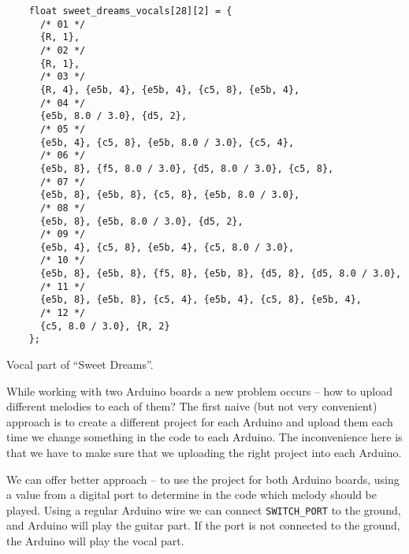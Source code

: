 \documentclass[../sparc.tex]{subfiles}
\begin{document}
\begin{listing}[!h]
  \begin{verbatim}
    float sweet_dreams_vocals[28][2] = {
      /* 01 */
      {R, 1},
      /* 02 */
      {R, 1},
      /* 03 */
      {R, 4}, {e5b, 4}, {e5b, 4}, {c5, 8}, {e5b, 4},
      /* 04 */
      {e5b, 8.0 / 3.0}, {d5, 2},
      /* 05 */
      {e5b, 4}, {c5, 8}, {e5b, 8.0 / 3.0}, {c5, 4},
      /* 06 */
      {e5b, 8}, {f5, 8.0 / 3.0}, {d5, 8.0 / 3.0}, {c5, 8},
      /* 07 */
      {e5b, 8}, {e5b, 8}, {c5, 8}, {e5b, 8.0 / 3.0},
      /* 08 */
      {e5b, 8}, {e5b, 8.0 / 3.0}, {d5, 2},
      /* 09 */
      {e5b, 4}, {c5, 8}, {e5b, 4}, {c5, 8.0 / 3.0},
      /* 10 */
      {e5b, 8}, {e5b, 8}, {f5, 8}, {e5b, 8}, {d5, 8}, {d5, 8.0 / 3.0},
      /* 11 */
      {e5b, 8}, {e5b, 8}, {c5, 4}, {e5b, 4}, {c5, 8}, {e5b, 4},
      /* 12 */
      {c5, 8.0 / 3.0}, {R, 2}
    };
  \end{verbatim}
  \caption{Vocal part of ``Sweet Dreams''.}
  \label{listing:music-band-sweet-dreams-2}
\end{listing}

While working with two Arduino boards a new problem occurs -- how to upload
different melodies to each of them?  The first naive (but not very convenient)
approach is to create a different project for each Arduino and upload them each
time we change something in the code to each Arduino.  The inconvenience here is
that we have to make sure that we uploading the right project into each Arduino.

We can offer better approach -- to use the project for both Arduino boards, using
a value from a digital port to determine in the code which melody should be
played.  Using a regular Arduino wire we can connect \texttt{SWITCH\_PORT} to
the ground, and Arduino will play the guitar part.  If the port is not connected
to the ground, the Arduino will play the vocal part.
\end{document}
